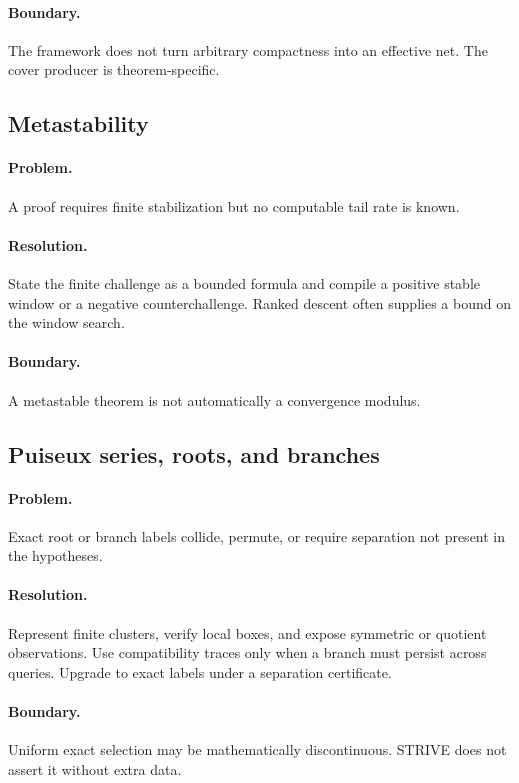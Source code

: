 \paragraph{Boundary.}
The framework does not turn arbitrary compactness into an effective net.  The
cover producer is theorem-specific.

\subsection{Metastability}

\paragraph{Problem.}
A proof requires finite stabilization but no computable tail rate is known.

\paragraph{Resolution.}
State the finite challenge as a bounded formula and compile a positive stable
window or a negative counterchallenge.  Ranked descent often supplies a bound
on the window search.

\paragraph{Boundary.}
A metastable theorem is not automatically a convergence modulus.

\subsection{Puiseux series, roots, and branches}

\paragraph{Problem.}
Exact root or branch labels collide, permute, or require separation not present
in the hypotheses.

\paragraph{Resolution.}
Represent finite clusters, verify local boxes, and expose symmetric or quotient
observations.  Use compatibility traces only when a branch must persist across
queries.  Upgrade to exact labels under a separation certificate.

\paragraph{Boundary.}
Uniform exact selection may be mathematically discontinuous.  STRIVE does not
assert it without extra data.

